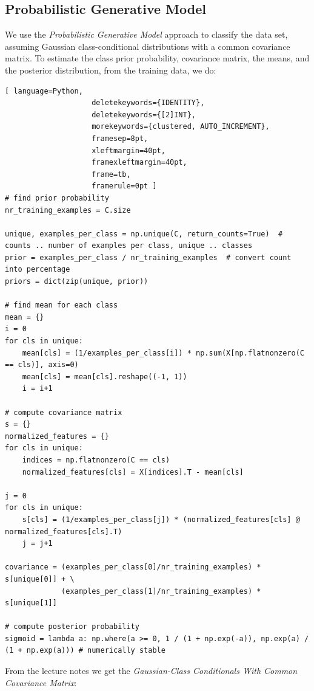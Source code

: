 \documentclass[a4paper,11pt,oneside]{article}
\begin{document}
\subsection{Probabilistic Generative Model}

We use the \textit{Probabilistic Generative Model} approach to classify the data set, assuming Gaussian class-conditional distributions with a common covariance matrix. To estimate the class prior probability, covariance matrix, the means, and the posterior distribution, from the training data, we do:
	\begin{lstlisting}[ language=Python,
                    deletekeywords={IDENTITY},
                    deletekeywords={[2]INT},
                    morekeywords={clustered, AUTO_INCREMENT},
                    framesep=8pt,
                    xleftmargin=40pt,
                    framexleftmargin=40pt,
                    frame=tb,
                    framerule=0pt ]
# find prior probability
nr_training_examples = C.size

unique, examples_per_class = np.unique(C, return_counts=True)  # counts .. number of examples per class, unique .. classes
prior = examples_per_class / nr_training_examples  # convert count into percentage
priors = dict(zip(unique, prior))

# find mean for each class
mean = {}
i = 0
for cls in unique:
    mean[cls] = (1/examples_per_class[i]) * np.sum(X[np.flatnonzero(C == cls)], axis=0)
    mean[cls] = mean[cls].reshape((-1, 1))
    i = i+1

# compute covariance matrix
s = {}
normalized_features = {}
for cls in unique:
    indices = np.flatnonzero(C == cls)
    normalized_features[cls] = X[indices].T - mean[cls]

j = 0
for cls in unique:
    s[cls] = (1/examples_per_class[j]) * (normalized_features[cls] @ normalized_features[cls].T)
    j = j+1

covariance = (examples_per_class[0]/nr_training_examples) * s[unique[0]] + \
             (examples_per_class[1]/nr_training_examples) * s[unique[1]]

# compute posterior probability
sigmoid = lambda a: np.where(a >= 0, 1 / (1 + np.exp(-a)), np.exp(a) / (1 + np.exp(a))) # numerically stable
\end{lstlisting}

From the lecture notes we get the \textit{Gaussian-Class Conditionals With Common Covariance Matrix}:
\end{document}
